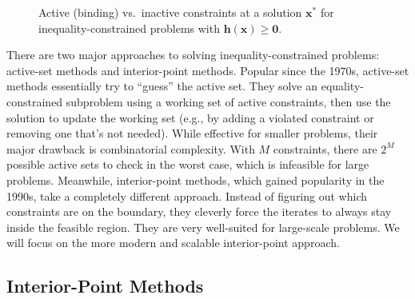 \begin{figure}[H]
{
    }
    \caption{Active (binding) vs.\ inactive constraints at a solution \(\mathbf{x}^*\) for inequality-constrained problems with \(\mathbf{h}(\mathbf{x})\ge \mathbf{0}\).}
    \label{fig:active-inactive}
\end{figure}

There are two major approaches to solving inequality-constrained problems: active-set methods and interior-point methods. Popular since the 1970s, active-set methods essentially try to ``guess'' the active set. They solve an equality-constrained subproblem using a working set of active constraints, then use the solution to update the working set (e.g., by adding a violated constraint or removing one that's not needed). While effective for smaller problems, their major drawback is combinatorial complexity. With $M$ constraints, there are $2^M$ possible active sets to check in the worst case, which is infeasible for large problems. Meanwhile, interior-point methods, which gained popularity in the 1990s, take a completely different approach. Instead of figuring out which constraints are on the boundary, they cleverly force the iterates to always stay inside the feasible region. They are very well-suited for large-scale problems. We will focus on the more modern and scalable interior-point approach.

\subsection{Interior-Point Methods}

